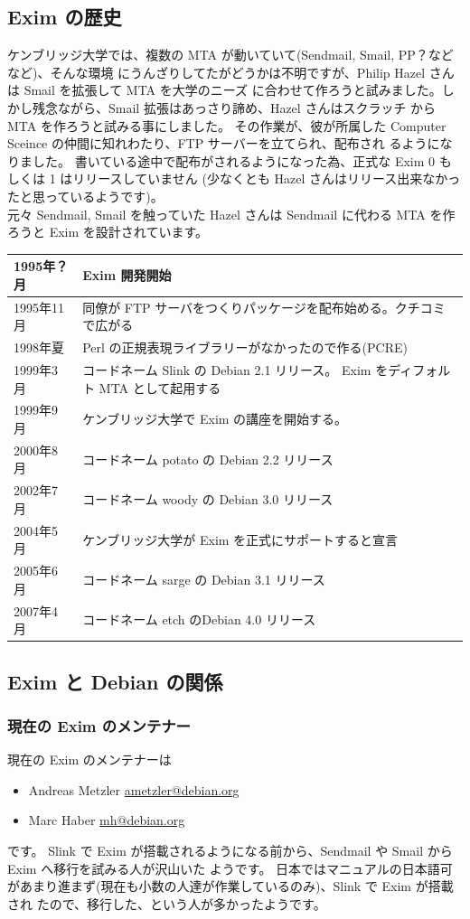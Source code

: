 \documentclass[mingoth,a4paper]{jsarticle}
\begin{document}
\subsection{Exim の歴史}
ケンブリッジ大学では、複数の MTA が動いていて(Sendmail, Smail, PP？などなど)、そんな環境
にうんざりしてたがどうかは不明ですが、Philip Hazel さんは Smail を拡張して MTA を大学のニーズ
に合わせて作ろうと試みました。しかし残念ながら、Smail 拡張はあっさり諦め、Hazel さんはスクラッチ
から MTA を作ろうと試みる事にしました。
その作業が、彼が所属した Computer Sceince の仲間に知れわたり、FTP サーバーを立てられ、配布され
るようになりました。
書いている途中で配布がされるようになった為、正式な Exim 0 もしくは 1 はリリースしていません
(少なくとも Hazel さんはリリース出来なかったと思っているようです)。\\
元々 Sendmail, Smail を触っていた Hazel さんは Sendmail に代わる MTA を作ろうと Exim 
を設計されています。 \\
\begin{tabular}[htb]{|l|l|} \hline
1995年？月 & Exim 開発開始\\ \hline
1995年11月 & 同僚が FTP サーバをつくりパッケージを配布始める。クチコミで広がる\\ \hline
1998年夏 & Perl の正規表現ライブラリーがなかったので作る(PCRE)\\ \hline
1999年3月 & コードネーム Slink の Debian 2.1 リリース。 Exim をディフォルト MTA として起用する \\ \hline
1999年9月 & ケンブリッジ大学で Exim の講座を開始する。 \\ \hline
2000年8月 & コードネーム potato の Debian 2.2 リリース\\ \hline
2002年7月 & コードネーム woody の Debian 3.0 リリース\\ \hline
2004年5月 & ケンブリッジ大学が Exim を正式にサポートすると宣言\\ \hline
2005年6月 & コードネーム sarge の Debian 3.1 リリース\\ \hline
2007年4月 & コードネーム etch のDebian 4.0 リリース\\ \hline
\end{tabular}

\subsection{Exim と Debian の関係}
\subsubsection{現在の Exim のメンテナー}
現在の Exim のメンテナーは
\begin{itemize}
\item Andreas Metzler  \url{ametzler@debian.org}
\item Marc Haber \url{mh@debian.org}
\end{itemize}
です。
Slink で Exim が搭載されるようになる前から、Sendmail や Smail から Exim へ移行を試みる人が沢山いた
ようです。
日本ではマニュアルの日本語可があまり進まず(現在も小数の人達が作業しているのみ)、Slink で Exim が搭載され
たので、移行した、という人が多かったようです。
\end{document}
